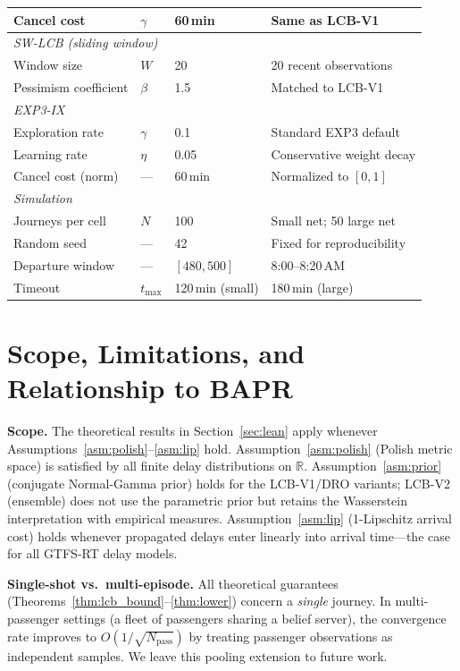 \documentclass[opre,dblanonrev]{informs4}
\begin{document}
\begin{APPENDICES}
\begin{table}
{\begin{tabular}{l l l p{6.0cm}}
Cancel cost           & $\gamma$    & 60\,min & Same as LCB-V1 \\
\midrule
\multicolumn{4}{l}{\textit{SW-LCB (sliding window)}} \\
Window size           & $W$         & 20      & 20 recent observations \\
Pessimism coefficient & $\beta$     & 1.5     & Matched to LCB-V1 \\
\midrule
\multicolumn{4}{l}{\textit{EXP3-IX}} \\
Exploration rate      & $\gamma$    & 0.1     & Standard EXP3 default \\
Learning rate         & $\eta$      & 0.05    & Conservative weight decay \\
Cancel cost (norm)    & ---         & 60\,min & Normalized to $[0,1]$ \\
\midrule
\multicolumn{4}{l}{\textit{Simulation}} \\
Journeys per cell     & $N$         & 100     & Small net; 50 large net \\
Random seed           & ---         & 42      & Fixed for reproducibility \\
Departure window      & ---         & $[480, 500]$ & 8:00--8:20\,AM \\
Timeout               & $t_{\max}$  & 120\,min (small) & 180\,min (large) \\
\bottomrule
\end{tabular}}
{}
\end{table}

\section{Scope, Limitations, and Relationship to BAPR}
\label{app:scope}

\textbf{Scope.}
The theoretical results in Section~\ref{sec:lean} apply whenever
Assumptions~\ref{asm:polish}--\ref{asm:lip} hold.
Assumption~\ref{asm:polish} (Polish metric space) is satisfied by
all finite delay distributions on $\mathbb{R}$.
Assumption~\ref{asm:prior} (conjugate Normal-Gamma prior) holds for
the LCB-V1/DRO variants; LCB-V2 (ensemble) does not use the parametric
prior but retains the Wasserstein interpretation with empirical measures.
Assumption~\ref{asm:lip} (1-Lipschitz arrival cost) holds whenever
propagated delays enter linearly into arrival time---the case for all
GTFS-RT delay models.

\textbf{Single-shot vs.\ multi-episode.}
All theoretical guarantees (Theorems~\ref{thm:lcb_bound}--\ref{thm:lower})
concern a \emph{single} journey.
In multi-passenger settings (a fleet of passengers sharing a belief server),
the convergence rate improves to $O(1/\sqrt{N_{\mathrm{pass}}})$ by
treating passenger observations as independent samples.
We leave this pooling extension to future work.


\end{APPENDICES}
\end{document}
